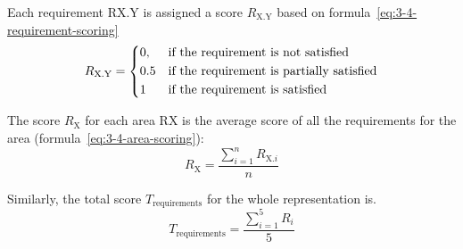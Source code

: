 Each requirement RX.Y is assigned a score $R_{\text{X.Y}}$ based on formula~\ref{eq:3-4-requirement-scoring}
\begin{equation}
    R_{\text{X.Y}} =
    \begin{dcases}
        0,  & \text{if the requirement is not satisfied}\\
        0.5 & \text{if the requirement is partially satisfied}\\
        1   & \text{if the requirement is satisfied}
    \end{dcases}
    \label{eq:3-4-requirement-scoring}
\end{equation}

The score $R_{\text{X}}$ for each area RX is the average score of all the requirements for the area (formula~\ref{eq:3-4-area-scoring}):
\begin{equation}
    R_{\text{X}} = \frac{\sum_{i=1}^{n} R_{\text{X.$i$}}}{n}
    \label{eq:3-4-area-scoring}
\end{equation}

Similarly, the total score $T_{\text{requirements}}$ for the whole representation is\textellipsis.
\begin{equation}
    T_{\text{requirements}} = \frac{\sum_{i=1}^{5} R_i}{5}
    \label{eq:3-4-representation-scoring}
\end{equation}

